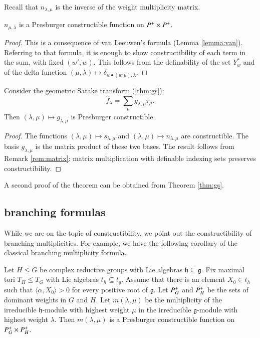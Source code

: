Recall that $n_{\lambda,\mu}$ is the inverse of the weight
multiplicity matrix.

\begin{theorem}\label{lemma:van-leeuwen} 
  $n_{\mu,\lambda}$ is a Presburger constructible function on
  $P^+\times P^+$.
\end{theorem}

\begin{proof} 
  This is a consequence of van Leeuwen's formula (Lemma
  \ref{lemma:van}).  Referring to that formula, it is enough to show
  constructibility of each term in the sum, with fixed $(w',w)$.  This
  follows from the definability of the set $Y^*_w$ and of the delta
  function $(\mu,\lambda)\mapsto \delta_{w\bullet (w'\mu),\lambda}$.
\end{proof}

\begin{corollary} 
  Consider the geometric Satake transform (\ref{thm:gs}):
\[
\hat f_\lambda = \sum_\mu g_{\lambda,\mu} \tau_\mu.
\]
Then $(\lambda,\mu)\mapsto g_{\lambda,\mu}$ is Presburger
constructible.
\end{corollary}

\begin{proof}  
  The functions $(\lambda,\mu)\mapsto s_{\lambda,\mu}$ and
  $(\lambda,\mu)\mapsto n_{\lambda,\mu}$ are constructible.  The basis
  $g_{\lambda,\mu}$ is the matrix product of these two bases.  The
  result follows from Remark \ref{rem:matrix}: matrix multiplication
  with definable indexing sets preserves constructibility.
\end{proof}

A second proof of the theorem can be obtained from Theorem
\ref{thm:gs}.

\subsection{branching formulas}

While we are on the topic of constructibility, we point out the
constructibility of branching multiplicities.  For example, we have
the following corollary of the classical branching multiplicity formula.


\begin{lemma} 
  Let $H\le G$ be complex reductive groups with Lie algebras
  ${\mathfrak h}\subseteq {\mathfrak g}$.  Fix maximal tori $T_H\le
  T_G$ with Lie algebras $t_h\subseteq t_g$.  Assume that there is an
  element $X_0\in t_h$ such that $\langle\alpha,X_0\rangle>0$ for
  every positive root of ${\mathfrak g}$.  Let $P^+_G$ and $P^+_H$
  be the sets of dominant weights in $G$ and $H$.  Let
  $m(\lambda,\mu)$ be the multiplicity of the irreducible $\mathfrak
  h$-module with highest weight $\mu$ in the irreducible $\mathfrak
  g$-module with highest weight $\lambda$.  Then $m(\lambda,\mu)$ is a
  Presburger constructible function on $P^+_G\times P^+_H$.
\end{lemma}

